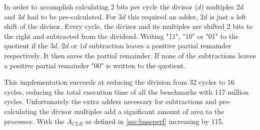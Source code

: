 \documentclass[final]{article}
\begin{document}
In order to accomplish calculating 2 bits per cycle the divisor ($d$) multiples $2d$ and $3d$ had to be pre-calculated. For $3d$ this required an adder, $2d$ is just a left shift of the divisor. Every cycle, the divisor and its multiples are shifted 2 bits to the right and subtracted from the dividend. Writing "11", "10" or "01" to the quotient if the $3d$, $2d$ or $1d$ subtraction leaves a positive partial remainder respectively. It then saves the partial remainder. If none of the subtractions leaves a positive partial remainder "00" is written to the quotient.

This implementation succeeds at reducing the division from 32 cycles to 16 cycles, reducing the total execution time of all the benchmarks with 117 million cycles. Unfortunately the extra adders necessary for subtractions and pre-calculating the divisor multiples add a significant amount of area to the processor. With the $A_{CLB}$ as defined in \cref{sec:baseperf} increasing by 115.
\end{document}
